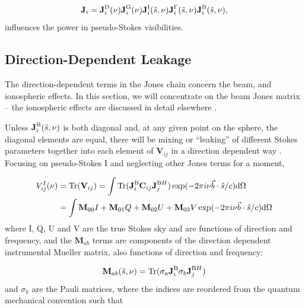 \begin{equation}
\textbf{J}_i = \textbf{J}_i^{\rm D}(\nu) \textbf{J}_i^{\rm G}(\nu)  \textbf{J}_i^{\rm I}(\hat{s},\nu) \textbf{J}_i^{\rm \Gamma}(\hat{s},\nu)  \textbf{J}_i^{\rm B}(\hat{s},\nu) ,
\end{equation}
influences the power in pseudo-Stokes visibilities.

\subsection{Direction-Dependent Leakage}

The direction-dependent terms in the Jones chain concern the beam, and ionospheric effects. In this section, we will concentrate on the beam Jones matrix -- the ionospheric effects are discussed in detail elsewhere \citep[e.g.][Martinot et al. (\textit{in prep.})]{Intema.09,Vedantham.15,Vedantham.16}.

Unless $\textbf{J}_i^{\rm B}(\hat{s},\nu)$ is both diagonal and, at any given point on the sphere, the diagonal elements are equal, there will be mixing or ``leaking'' of different Stokes parameters together into each element of $\textbf{V}_{ij}$ in a direction dependent way \citep[e.g.][]{Geil.11, Smirnov.11, Smirnov.11.2, Nunhokee.17}. Focusing on pseudo-Stokes I and neglecting other Jones terms for a moment,

\begin{equation}
\begin{split}
V^I_{ij}(\nu) &= {\rm Tr}(\textbf{V}_{ij}) = \int {\rm Tr}(\textbf{J}_i^{\rm B}\textbf{C}_{ij}\textbf{J}_j^{{\rm B}H}) \exp(-2\pi i \nu \vec{b}\cdot\hat{s}/c) {\rm d}\Omega \\
					  &= \int \textbf{M}_{00}I + \textbf{M}_{01}Q + \textbf{M}_{02}U + \textbf{M}_{03}V \exp(-2\pi i \nu \vec{b}\cdot\hat{s}/c) {\rm d}\Omega
\end{split}
\label{eq:interferometry_pseudo-stokes-I-leakage}
\end{equation}
where I, Q, U and V are the true Stokes sky and are functions of direction and frequency, and the $\textbf{M}_{ab}$ terms are components of the direction dependent instrumental Mueller matrix, also functions of direction and frequency:

\begin{equation}
\textbf{M}_{ab}(\hat{s},\nu) = {\rm Tr} ( \sigma_a \textbf{J}_i^{\rm B} \sigma_b \textbf{J}_j^{{\rm B}H})
\label{eq:interferometry_mueller-terms}
\end{equation}
and $\sigma_k$ are the Pauli matrices, where the indices are reordered from the quantum mechanical convention such that 


